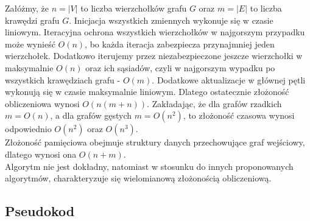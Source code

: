     Załóżmy, że $n = |V|$ to liczba wierzchołków grafu $G$ oraz $m = |E|$ to liczba krawędzi grafu $G$. 
    Inicjacja wszystkich zmiennych wykonuje się w czasie liniowym. Iteracyjna ochrona wszystkich wierzchołków w najgorszym przypadku może wynieść $O(n)$, bo każda iteracja zabezpiecza przynajmniej jeden wierzchołek. Dodatkowo iterujemy przez niezabezpieczone jeszcze wierzchołki w maksymalnie $O(n)$ oraz ich sąsiadów, czyli w najgorszym wypadku po wszystkich krawędziach grafu - $O(m)$. Dodatkowe aktualizacje w głównej pętli wykonują się w czasie maksymalnie liniowym. Dlatego ostatecznie złożoność obliczeniowa wynosi $O(n(m+n))$. Zakładając, że dla grafów rzadkich $m=O(n)$, a dla grafów gęstych $m=O(n^2)$, to złożoność czasowa wynosi odpowiednio $O(n^2)$ oraz $O(n^3)$.\\
    Złożoność pamięciowa obejmuje struktury danych przechowujące graf wejściowy, dlatego wynosi ona $O(n+m)$.\\
    Algorytm nie jest dokładny, natomiast w stosunku do innych proponowanych algorytmów, charakteryzuje się wielomianową złożonością obliczeniową.
    
    \subsection{Pseudokod}

